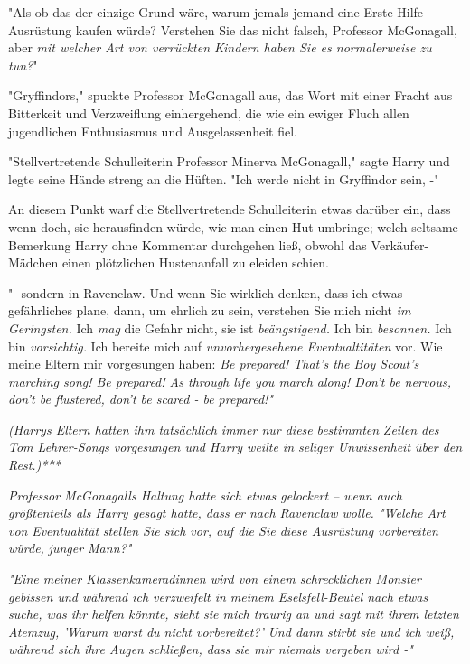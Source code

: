 {"Als ob das der einzige Grund wäre, warum jemals jemand eine Erste-Hilfe-Ausrüstung kaufen würde? Verstehen Sie das nicht falsch, Professor McGonagall, aber \emph{mit welcher Art von verrückten Kindern haben Sie es normalerweise zu tun?}"

"Gryffindors," spuckte Professor McGonagall aus, das Wort mit einer Fracht aus Bitterkeit und Verzweiflung einhergehend, die wie ein ewiger Fluch allen jugendlichen Enthusiasmus und Ausgelassenheit fiel.

"Stellvertretende Schulleiterin Professor Minerva McGonagall," sagte Harry und legte seine Hände streng an die Hüften. "Ich werde nicht in Gryffindor sein, -"

An diesem Punkt warf die Stellvertretende Schulleiterin etwas darüber ein, dass wenn doch, sie herausfinden würde, wie man einen Hut umbringe; welch seltsame Bemerkung Harry ohne Kommentar durchgehen ließ, obwohl das Verkäufer-Mädchen einen plötzlichen Hustenanfall zu eleiden schien.

"- sondern in Ravenclaw. Und wenn Sie wirklich denken, dass ich etwas gefährliches plane, dann, um ehrlich zu sein, verstehen Sie mich nicht \emph{im Geringsten.} Ich \emph{mag} die Gefahr nicht, sie ist \emph{beängstigend.} Ich bin \emph{besonnen.} Ich bin \emph{vorsichtig.} Ich bereite mich auf \emph{unvorhergesehene Eventualtitäten} vor. Wie meine Eltern mir vorgesungen haben: \emph{Be prepared! That's the Boy Scout's marching song! Be prepared! As through life you march along! Don't be nervous, don't be flustered, don't be scared - be prepared!"}

\emph{(Harrys Eltern hatten ihm tatsächlich immer nur diese} \emph{\emph{bestimmten}} \emph{Zeilen des Tom Lehrer-Songs vorgesungen und Harry weilte in seliger Unwissenheit über den Rest.)***}

\emph{Professor McGonagalls Haltung hatte sich etwas gelockert -- wenn auch größtenteils als Harry gesagt hatte, dass er nach Ravenclaw wolle. "Welche Art von} \emph{\emph{Eventualität}} \emph{stellen Sie sich vor, auf die Sie diese Ausrüstung vorbereiten würde,} \emph{\emph{junger Mann?}"}

\emph{"Eine meiner Klassenkameradinnen wird von einem schrecklichen Monster gebissen und während ich verzweifelt in meinem Eselsfell-Beutel nach etwas suche, was ihr helfen könnte, sieht sie mich traurig an und sagt mit ihrem letzten Atemzug,} \emph{\emph{'Warum warst du nicht vorbereitet?'}} \emph{Und dann stirbt sie und ich weiß, während sich ihre Augen schließen, dass sie mir niemals vergeben wird -"}

}
